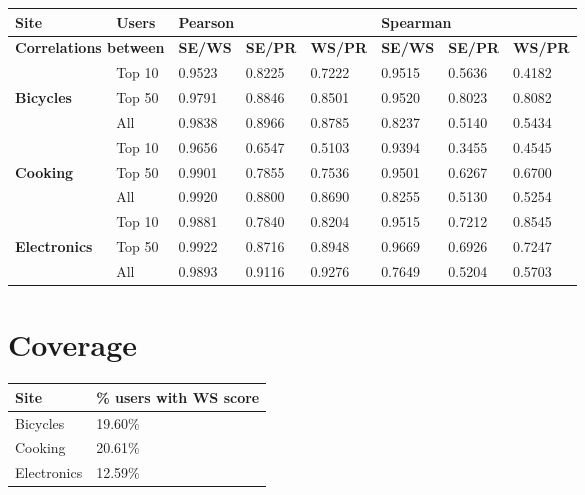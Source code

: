 \documentclass[]{final_report}
\begin{document}
\begin{minipage}{\linewidth}
\centering
\begin{tabular}{|l|l||l|l|l||l|l|l|}
\hline
\textbf{Site} & \textbf{Users} & \multicolumn{3}{l||}{\textbf{Pearson}} & \multicolumn{3}{l|}{\textbf{Spearman}} \\ \hline
\multicolumn{2}{|l||}{\textbf{Correlations between}} & \textbf{SE/WS} & \textbf{SE/PR} & \textbf{WS/PR} & \textbf{SE/WS} & \textbf{SE/PR} & \textbf{WS/PR} \\
\hline
~ 					& Top 10 & 0.9523 & 0.8225 & 0.7222 & 0.9515 & 0.5636 & 0.4182 \\      
\textbf{Bicycles}	& Top 50 & 0.9791 & 0.8846 & 0.8501 & 0.9520 & 0.8023 & 0.8082 \\
~ 					& All    & 0.9838 & 0.8966 & 0.8785 & 0.8237 & 0.5140 & 0.5434 \\
\hline
~           		& Top 10 & 0.9656 & 0.6547 & 0.5103 & 0.9394 & 0.3455 & 0.4545 \\
\textbf{Cooking}    & Top 50 & 0.9901 & 0.7855 & 0.7536 & 0.9501 & 0.6267 & 0.6700 \\
~          			& All    & 0.9920 & 0.8800 & 0.8690 & 0.8255 & 0.5130 & 0.5254 \\
\hline
~           		& Top 10 & 0.9881 & 0.7840 & 0.8204 & 0.9515 & 0.7212 & 0.8545 \\
\textbf{Electronics}& Top 50 & 0.9922 & 0.8716 & 0.8948 & 0.9669 & 0.6926 & 0.7247 \\
~           		& All    & 0.9893 & 0.9116 & 0.9276 & 0.7649 & 0.5204 & 0.5703 \\
\hline
\end{tabular}\par
{} \label{tab:corrresults}
\end{minipage}

\section{Coverage}

\begin{minipage}{\linewidth}
\centering
\begin{tabular}{|l|l|}
\hline \textbf{Site} & \textbf{\% users with WS score} \\ 
\hline Bicycles & 19.60\% \\ 
\hline Cooking & 20.61\% \\ 
\hline Electronics & 12.59\% \\ 
\hline 
\end{tabular}\par
{} \label{tab:coverage}
\end{minipage}
\end{document}

